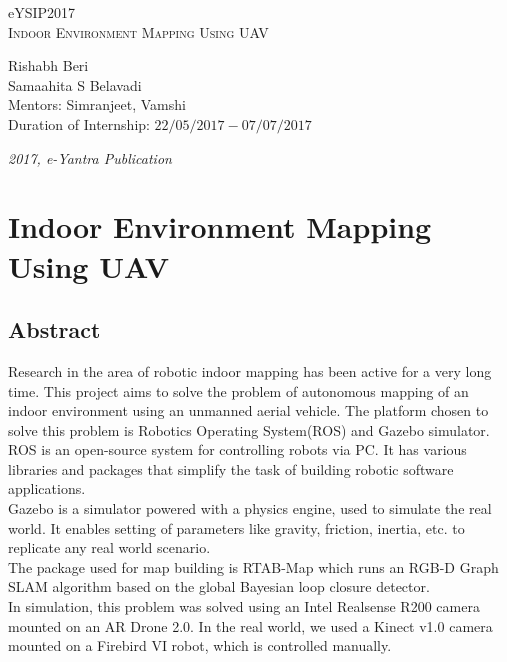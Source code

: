 \documentclass[a4paper,12pt,oneside]{book}
\begin{document}
\begin{titlepage}
\raggedright
{\Large eYSIP2017\\[1cm]}
{\Huge\scshape Indoor Environment Mapping Using UAV \\[.1in]}
\vfill
\begin{flushright}
{\large Rishabh Beri \\}
{\large Samaahita S Belavadi \\}
{\large Mentors: Simranjeet, Vamshi \\}
{\large Duration of Internship: $ 22/05/2017-07/07/2017 $ \\}
\end{flushright}

{\itshape 2017, e-Yantra Publication}
\end{titlepage}

\chapter[Project Tag]{Indoor Environment Mapping Using UAV}
\section*{Abstract}
Research in the area of robotic indoor mapping has been active for a very long time. This project aims to solve the problem of autonomous mapping of an indoor environment using an unmanned aerial vehicle. The platform chosen to solve this problem is Robotics Operating System(ROS) and Gazebo simulator. \\
ROS is an open-source system for controlling robots via PC. It has various libraries and packages that simplify the task of building robotic software applications. \\
Gazebo is a simulator powered with a physics engine, used to simulate the real world. It enables setting of parameters like gravity, friction, inertia, etc. to replicate any real world scenario. \\
The package used for map building is RTAB-Map which runs an RGB-D Graph SLAM algorithm based on the global Bayesian loop closure detector. \\
In simulation, this problem was solved using an Intel Realsense R200 camera mounted on an AR Drone 2.0. In the real world, we used a Kinect v1.0 camera mounted on a Firebird VI robot, which is controlled manually.
\end{document}
